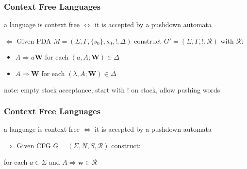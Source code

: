 \documentclass{beamer}
\begin{document}

\begin{frame}
\frametitle{Context Free Languages}
\begin{theorem}{}
  a language is context free $\iff$ it is accepted by a pushdown automata
\end{theorem}
\begin{block}{$\Leftarrow$}
  Given PDA $M = (\Sigma, \Gamma, \{s_0\}, s_0, !, \Delta)$ construct $G' =
  (\Sigma, \Gamma, !, \mathcal{R})$ with $\mathcal{R}$:
  \begin{itemize}
  \item $A \Rightarrow a\mathbf{W}$ for each $(a, A; \mathbf{W}) \in \Delta$
    \item $A \Rightarrow \mathbf{W}$ for each $(\lambda, A; \mathbf{W}) \in \Delta$
   \end{itemize}
  note: empty stack acceptance, start with ! on stack, allow pushing words
\end{block}
\end{frame}

\begin{frame}
\frametitle{Context Free Languages}
\begin{theorem}{}
  a language is context free $\iff$ it is accepted by a pushdown automata
\end{theorem}
\begin{block}{$\Rightarrow$}
  Given CFG $G = (\Sigma, N, S, \mathcal{R})$ construct:
\begin{figure}
  \centering
{}
  \end{figure}
  for each $a \in \Sigma$ and $A \Rightarrow \mathbf{w} \in \mathcal{R}$\\
\end{block}
\end{frame}
\end{document}
